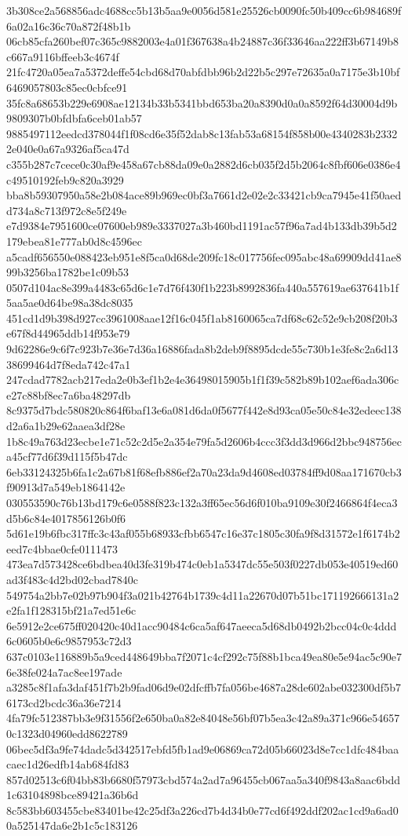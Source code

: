 {3b308ce2a568856adc4688cc5b13b5aa9e0056d581e25526cb0090fc50b409cc6b984689f6a02a16c36c70a872f48b1b
06cb85cfa260bef07c365c9882003e4a01f367638a4b24887c36f33646aa222ff3b67149b8c667a9116bffeeb3c4674f
21fc4720a05ea7a5372deffe54cbd68d70abfdbb96b2d22b5c297e72635a0a7175e3b10bf6469057803c85ec0cbfce91
35fc8a68653b229e6908ae12134b33b5341bbd653ba20a8390d0a0a8592f64d30004d9b9809307b0bfdbfa6ceb01ab57
9885497112eedcd378044f1f08cd6e35f52dab8c13fab53a68154f858b00e4340283b23322e040e0a67a9326af5ca47d
c355b287c7cece0c30af9e458a67cb88da09e0a2882d6cb035f2d5b2064c8fbf606e0386e4c49510192feb9c820a3929
bba8b59307950a58e2b084ace89b969ec0bf3a7661d2e02e2c33421cb9ca7945e41f50aedd734a8c713f972c8e5f249e
e7d9384e7951600ce07600eb989e3337027a3b460bd1191ac57f96a7ad4b133db39b5d2179ebea81e777ab0d8c4596ec
a5cadf656550e088423eb951e8f5ca0d68de209fc18c017756fec095abc48a69909dd41ae899b3256ba1782be1c09b53
0507d104ac8e399a4483c65d6c1e7d76f430f1b223b8992836fa440a557619ae637641b1f5aa5ae0d64be98a38dc8035
451cd1d9b398d927cc3961008aae12f16c045f1ab8160065ca7df68c62c52e9cb208f20b3e67f8d44965ddb14f953e79
9d62286e9c6f7c923b7e36e7d36a16886fada8b2deb9f8895dcde55c730b1e3fe8c2a6d1338699464d7f8eda742c47a1
247cdad7782acb217eda2e0b3ef1b2e4e36498015905b1f1f39c582b89b102aef6ada306ce27c88bf8ec7a6ba48297db
8c9375d7bdc580820c864f6baf13e6a081d6da0f5677f442e8d93ca05e50c84e32edeec138d2a6a1b29e62aaea3df28e
1b8c49a763d23ecbe1e71c52c2d5e2a354e79fa5d2606b4ccc3f3dd3d966d2bbc948756eca45cf77d6f39d115f5b47dc
6eb33124325b6fa1c2a67b81f68efb886ef2a70a23da9d4608ed03784ff9d08aa171670cb3f90913d7a549eb1864142e
030553590c76b13bd179c6e0588f823c132a3ff65ec56d6f010ba9109e30f2466864f4eca3d5b6c84e4017856126b0f6
5d61e19b6fbc317ffc3c43af055b68933cfbb6547c16e37c1805c30fa9f8d31572e1f6174b2eed7c4bbae0cfe0111473
473ea7d573428ce6bdbea40d3fe319b474c0eb1a5347dc55e503f0227db053e40519ed60ad3f483c4d2bd02cbad7840c
549754a2bb7e02b97b904f3a021b42764b1739c4d11a22670d07b51bc171192666131a2e2fa1f128315bf21a7ed51e6c
6e5912e2ce675ff020420c40d1acc90484c6ca5af647aeeca5d68db0492b2bcc04c0c4ddd6c0605b0e6c9857953c72d3
637c0103e116889b5a9ced448649bba7f2071c4cf292c75f88b1bca49ea80e5e94ac5c90e76e38fe024a7ac8ee197ade
a3285c8f1afa3daf451f7b2b9fad06d9e02dfcffb7fa056be4687a28de602abe032300df5b76173cd2bcdc36a36e7214
4fa79fc512387bb3e9f31556f2e650ba0a82e84048e56bf07b5ea3c42a89a371c966e546570c1323d04960edd8622789
06bec5df3a9fe74dadc5d342517ebfd5fb1ad9e06869ca72d05b66023d8e7cc1dfc484baacaec1d26edfb14ab684fd83
857d02513c6f04bb83b6680f57973cbd574a2ad7a96455cb067aa5a340f9843a8aac6bdd1c63104898bce89421a36b6d
8c583bb603455cbe83401be42c25df3a226cd7b4d34b0e77cd6f492ddf202ac1cd9a6ad00a525147da6e2b1c5c183126
}
